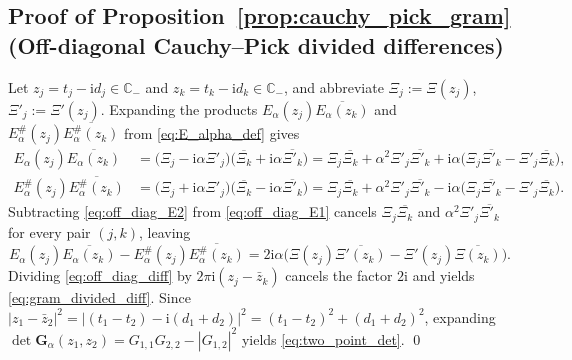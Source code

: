 \documentclass[11pt,reqno,a4paper]{amsart}
\theoremstyle{plain}
\theoremstyle{definition}
\theoremstyle{remark}
\numberwithin{equation}{section}
\newcommand{\ii}{\mathrm{i}}
\begin{document}
\subsection{Proof of Proposition~\ref{prop:cauchy_pick_gram} (Off-diagonal Cauchy--Pick divided differences)}\label{app:cauchy_pick}
Let $z_j = t_j - \ii d_j \in \mathbb{C}_-$ and $z_k = t_k - \ii d_k \in \mathbb{C}_-$, and abbreviate $\Xi_j := \Xi(z_j)$, $\Xi'_j := \Xi'(z_j)$. Expanding the products $E_\alpha(z_j)\overline{E_\alpha(z_k)}$ and $E_\alpha^\#(z_j)\overline{E_\alpha^\#(z_k)}$ from \eqref{eq:E_alpha_def} gives
\begin{align}
  E_\alpha(z_j)\overline{E_\alpha(z_k)}
  &= \big(\Xi_j - \ii\alpha\Xi'_j\big)\big(\overline{\Xi_k} + \ii\alpha\overline{\Xi'_k}\big)
   = \Xi_j\overline{\Xi_k} + \alpha^2\Xi'_j\overline{\Xi'_k} + \ii\alpha\big(\Xi_j\overline{\Xi'_k} - \Xi'_j\overline{\Xi_k}\big), \label{eq:off_diag_E1} \\
  E_\alpha^\#(z_j)\overline{E_\alpha^\#(z_k)}
  &= \big(\Xi_j + \ii\alpha\Xi'_j\big)\big(\overline{\Xi_k} - \ii\alpha\overline{\Xi'_k}\big)
   = \Xi_j\overline{\Xi_k} + \alpha^2\Xi'_j\overline{\Xi'_k} - \ii\alpha\big(\Xi_j\overline{\Xi'_k} - \Xi'_j\overline{\Xi_k}\big). \label{eq:off_diag_E2}
\end{align}
Subtracting \eqref{eq:off_diag_E2} from \eqref{eq:off_diag_E1} cancels $\Xi_j\overline{\Xi_k}$ and $\alpha^2\Xi'_j\overline{\Xi'_k}$ for every pair $(j,k)$, leaving
\begin{equation}\label{eq:off_diag_diff}
  E_\alpha(z_j)\overline{E_\alpha(z_k)} - E_\alpha^\#(z_j)\overline{E_\alpha^\#(z_k)}
  = 2\ii\alpha\big(\Xi(z_j)\overline{\Xi'(z_k)} - \Xi'(z_j)\overline{\Xi(z_k)}\big).
\end{equation}
Dividing \eqref{eq:off_diag_diff} by $2\pi\ii(z_j - \bar{z}_k)$ cancels the factor $2\ii$ and yields \eqref{eq:gram_divided_diff}. Since $|z_1 - \bar{z}_2|^2 = |(t_1 - t_2) - \ii(d_1 + d_2)|^2 = (t_1 - t_2)^2 + (d_1 + d_2)^2$, expanding $\det\mathbf{G}_\alpha(z_1,z_2) = G_{1,1}G_{2,2} - |G_{1,2}|^2$ yields \eqref{eq:two_point_det}. \qed
\end{document}
